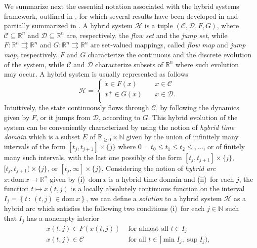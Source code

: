 \documentclass[twocolumn]{autart}
\newcommand{\realn}{\real^n}
\newcommand\real{\ensuremath{{\mathbb R}}}
\newcommand{\setof}[1]{\ensuremath{\left \{ #1 \right \}}}
\newcommand{\tto}{\ensuremath{\rightrightarrows}}
\begin{document}
We summarize next the essential notation associated with the hybrid 
systems framework, outlined in \cite{Goebel04}, 
for which several results have been developed in
\cite{Goebel06,SanfeliceTAC07,Sanfelice08} and partially 
summarized in \cite{GoebelCSM09}. 
A hybrid system $\mathcal{H}$ 
is a tuple $(\mathcal{C},\mathcal{D},F,G)$, where $\mathcal{C}\subseteq\realn$ and $\mathcal{D}\subseteq\realn$ 
are, respectively, the \emph{flow set} and the \emph{jump set}, 
while $F:\realn\tto\realn$ and $G:\realn\tto\realn$ are set-valued
mappings, called \emph{flow map} and 
\emph{jump map}, respectively.
$F$ and $G$ characterize the continuous and the discrete 
evolution of the system, while $\mathcal{C}$ and $\mathcal{D}$ 
characterize subsets of $\realn$ 
where such evolution may occur. A hybrid system is usually
represented as follows
\begin{equation}
 \mathcal{H} =
 \left\{
 \begin{array}{rl} 
  \dot{x} \in F(x) & \quad x\in \mathcal{C} \\
  x^+ \!\! \in G(x) & \quad x\in \mathcal{D}. \\
 \end{array}
 \right. \label{sys}
\end{equation}
Intuitively, the state continuously flows through $\mathcal{C}$, 
by following the dynamics given by $F$, or it jumps from $\mathcal{D}$, 
according to $G$. This hybrid evolution of
the system can be conveniently characterized by using the
notion of \emph{hybrid time domain} which is a subset
$E$ of $\real_{\geq0} \times \mathbb{N}$ given by
the union of infinitely many intervals of the form
$[t_j,t_{j+1}]\times\{j\}$ where $0=t_0\leq t_1 \leq t_2 \leq,\dots$, 
or of finitely many such intervals, with the last one possibly of the form
$[t_j,t_{j+1}]\times\{j\}$, $[t_j,t_{j+1})\times\{j\}$, or
$[t_j,\infty]\times\{j\}$. Considering the notion of 
\emph{hybrid arc} $x:\mathrm{dom}\, x \to \realn$ 
given by
(i)~$\mathrm{dom}\, x$ is a hybrid time domain and 
(ii)~for each $j$, the function $t\mapsto x(t,j)$ is a locally absolutely 
continuous function on the interval $I_j=\setof{t\,:\,(t,j)\in\mathrm{dom}\,x}$,
we can define a \emph{solution} to a hybrid system $\mathcal{H}$ 
as a hybrid arc which satisfies the following two conditions
(i)~for each $j\in\mathbb{N}$ such that $I_j$ has a nonempty interior
\begin{equation*}
 \label{eq:hybsol_CF}
\begin{array}{ll} 
 \dot{x}(t,j) \in F(x(t,j)) & \mbox{ for almost all } t \in I_j \\ 
 x(t,j) \in \mathcal{C} & \mbox{ for all } t\in [\min I_j, \sup I_j),
\end{array}
\end{equation*}
\end{document}
